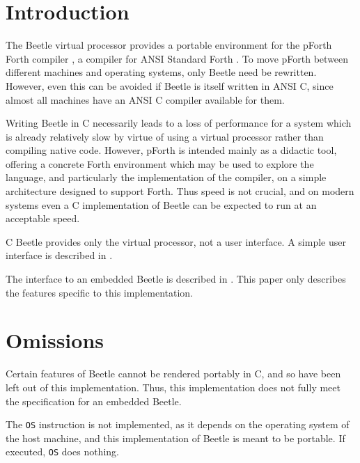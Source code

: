 %
%
%
%


\section{Introduction}

The Beetle virtual processor \cite{beetledis} provides a portable environment
for the pForth Forth compiler \cite{beetledis}, a compiler for ANSI Standard
Forth \cite{ANSIforth}. To move pForth between different machines and
operating systems, only Beetle need be rewritten. However, even this can be
avoided if Beetle is itself written in ANSI C, since almost all machines have
an ANSI C compiler available for them.

Writing Beetle in C necessarily leads to a loss of performance for a system
which is already relatively slow by virtue of using a virtual processor
rather than compiling native code. However, pForth is intended mainly as a
didactic tool, offering a concrete Forth environment which may be used to
explore the language, and particularly the implementation of the compiler, on
a simple architecture designed to support Forth. Thus speed is not crucial,
and on modern systems even a C implementation of Beetle can be expected to
run at an acceptable speed.

C Beetle provides only the virtual processor, not a user interface. A simple
user interface is described in \cite{beetledis}.

The interface to an embedded Beetle is described in \cite{beetledis}. This paper
only describes the features specific to this implementation.


\section{Omissions}
\label{omissions}

Certain features of Beetle cannot be rendered portably in C, and so have been
left out of this implementation. Thus, this implementation does not fully
meet the specification for an embedded Beetle.

The {\tt OS} instruction is not implemented, as it depends on the operating
system of the host machine, and this implementation of Beetle is meant to be
portable. If executed, {\tt OS} does nothing.

